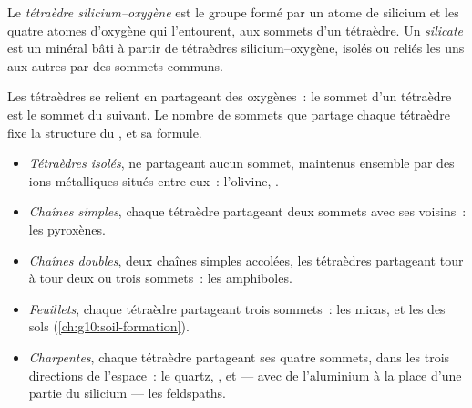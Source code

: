 \begin{definition}\label{def:g11:minerals:silicate}
Le \emph{tétraèdre silicium--oxygène}
est le groupe  formé par un atome de silicium et les quatre atomes
d'oxygène qui l'entourent, aux sommets d'un tétraèdre. Un
\emph{silicate} est un minéral bâti à partir de tétraèdres
silicium--oxygène, isolés ou reliés les uns aux autres par des sommets
communs.
\end{definition}

Les tétraèdres se relient en partageant des oxygènes~: le sommet d'un
tétraèdre est le sommet du suivant. Le nombre de sommets que partage chaque
tétraèdre fixe la structure du , et sa formule.
\begin{itemize}
  \item \emph{Tétraèdres isolés}, ne partageant aucun sommet, maintenus
        ensemble par des ions métalliques situés entre eux~: l'olivine,
        .
  \item \emph{Chaînes simples}, chaque tétraèdre partageant deux sommets
        avec ses voisins~: les pyroxènes.
  \item \emph{Chaînes doubles}, deux chaînes simples accolées, les
        tétraèdres partageant tour à tour deux ou trois sommets~: les
        amphiboles.
  \item \emph{Feuillets}, chaque tétraèdre partageant trois sommets~: les
        micas, et les  des sols
        (\cref{ch:g10:soil-formation}).
  \item \emph{Charpentes}, chaque tétraèdre partageant ses quatre sommets,
        dans les trois directions de l'espace~: le quartz, , et ---
        avec de l'aluminium à la place d'une partie du silicium --- les
        feldspaths.
\end{itemize}


